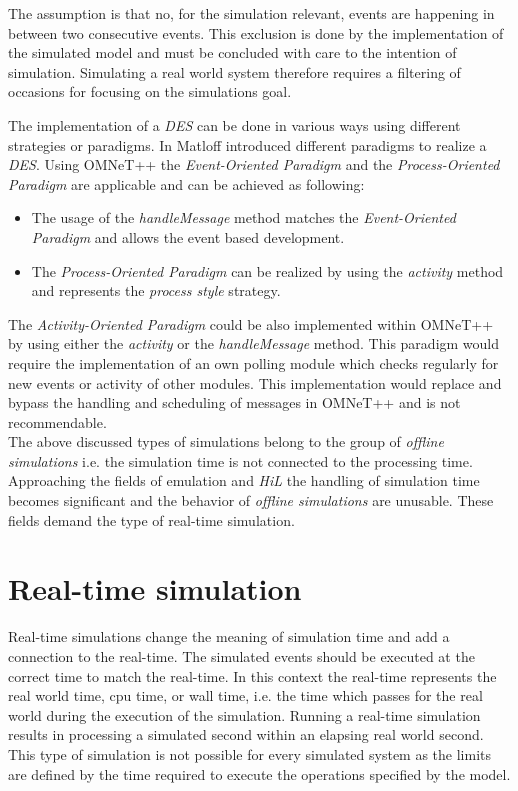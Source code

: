 The assumption is that no, for the simulation relevant, events are happening in between two consecutive events.
This exclusion is done by the implementation of the simulated model and must be concluded with care to the intention of simulation.
Simulating a real world system therefore requires a filtering of occasions for focusing on the simulations goal. \cite[section 4.1.1]{omnet_manual}

The implementation of a \emph{DES} can be done in various ways using different strategies or paradigms.
In \cite[chapter 2]{matloff_introduction_2008} Matloff introduced different paradigms to realize a \emph{DES}.
Using OMNeT++ the \emph{Event-Oriented Paradigm} and the \emph{Process-Oriented Paradigm} are applicable and can be achieved as following:

\begin{itemize}
    \item The usage of the \emph{handleMessage} method matches the \emph{Event-Oriented Paradigm} and allows the event based development.
    \item The \emph{Process-Oriented Paradigm} can be realized by using the \emph{activity} method and represents the \emph{process style} strategy.
\end{itemize}

The \emph{Activity-Oriented Paradigm} could be also implemented within OMNeT++ by using either the \emph{activity} or the \emph{handleMessage} method.
This paradigm would require the implementation of an own polling module which checks regularly for new events or activity of other modules.
This implementation would replace and bypass the handling and scheduling of messages in OMNeT++ and is not recommendable. \cite[chapter 2.1]{matloff_introduction_2008}
\\

The above discussed types of simulations belong to the group of \emph{offline simulations} i.e. the simulation time is not connected to the processing time.
Approaching the fields of emulation and \emph{HiL} the handling of simulation time becomes significant and the behavior of \emph{offline simulations} are unusable.
These fields demand the type of real-time simulation.  \cite[section III.B]{belanger_what_2010}

\section{Real-time simulation}
\label{sec:simulation_real_time}
Real-time simulations change the meaning of simulation time and add a connection to the real-time.
The simulated events should be executed at the correct time to match the real-time.
In this context the real-time represents the real world time, cpu time, or wall time, i.e. the time which passes for the real world during the execution of the simulation.
Running a real-time simulation results in processing a simulated second within an elapsing real world second.
This type of simulation is not possible for every simulated system as the limits are defined by the time required to execute the operations specified by the model.

